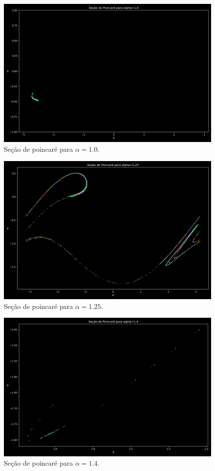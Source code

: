 \documentclass[12pt,a4paper]{article}
\begin{document}
\begin{figure}[H]
\centering
\includegraphics[width=\textwidth]{../tarefa-4c/secao_poincare_alpha_1.0.png}
\caption{Seção de poincaré para $\alpha = 1.0$.}
\end{figure}

\begin{figure}[H]
\centering
\includegraphics[width=\textwidth]{../tarefa-4c/secao_poincare_alpha_1.25.png}
\caption{Seção de poincaré para $\alpha = 1.25$.}
\end{figure}

\begin{figure}[H]
\centering
\includegraphics[width=\textwidth]{../tarefa-4c/secao_poincare_alpha_1.4.png}
\caption{Seção de poincaré para $\alpha = 1.4$.}
\end{figure}
\end{document}

